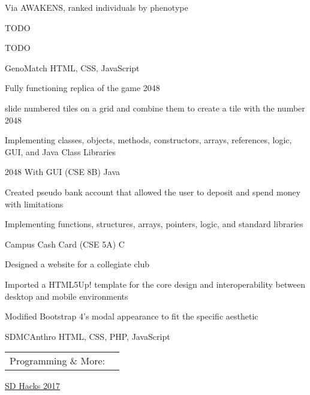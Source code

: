 \documentclass[]{awesome-cv}
\begin{document}
\begin{cventries}
	\cventry
	{\begin{cvitems}
	    \item Via AWAKENS, ranked individuals by phenotype
        \item TODO
        \item TODO
    \end{cvitems}}
	{GenoMatch}
	{HTML, CSS, JavaScript}
	{}
	{}
	
	\vspace{-5mm}
	\cventry
	{\begin{cvitems}
        \item Fully functioning replica of the game 2048
        \item slide numbered tiles on a grid and combine them to create a tile with the number 2048
        \item Implementing classes, objects, methods, constructors, arrays, references, logic, GUI, and Java Class Libraries
    \end{cvitems}}
	{2048 With GUI (CSE 8B)}
	{Java}
	{}
	{}

	\vspace{-5mm}
	\cventry
	{\begin{cvitems}
        \item Created pseudo bank account that allowed the user to deposit and spend money with limitations
        \item Implementing functions, structures, arrays, pointers, logic, and standard libraries
    \end{cvitems}}
	{Campus Cash Card (CSE 5A)}
	{C}
	{}
	{}

	\vspace{-5mm}
	\cventry
	{\begin{cvitems}
        \item Designed a website for a collegiate club
        \item Imported a HTML5Up! template for the core design and interoperability between desktop and mobile environments
        \item Modified Bootstrap 4’s modal appearance to fit the specific aesthetic
    \end{cvitems}}
	{SDMCAnthro}
	{HTML, CSS, PHP, JavaScript}
	{}
	{}

	\vspace{-5mm}
\end{cventries}
\begin{cventries}
	\cventry
	{}
	{\def\arraystretch{1.15}{\begin{tabular}{ l l }
		Programming \& More:  & {\skill{ Java, C, HTML, CSS, JavaScript, \LaTeX, MySQL, Git, Unix Shell, Ubuntu}} 
		\end{tabular}}}
	{}
	{}
	{}
\end{cventries}

\vspace{-7mm}
\begin{cvhonors}
	\cvhonor
	{\begin{cvitems}
	    \item \href{https://www.sdhacks.io/}{SD Hacks 2017}
	\end{cvitems}}
	{}
	{}
	{}
\end{cvhonors}
\ 
\end{document}

